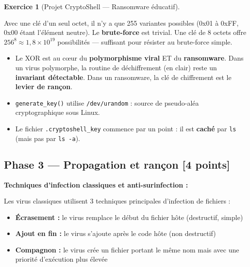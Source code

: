 \documentclass[a4paper,11pt]{article}
\theoremstyle{plain}
\theoremstyle{definition}
\newtheorem{exercice}{Exercice}
\begin{document}
\begin{exercice}[Projet CryptoShell --- Ransomware éducatif]
\begin{correction}
\begin{attention}
Avec une clé d'un seul octet, il n'y a que 255 variantes possibles (0x01 à 0xFF, 0x00 étant l'élément neutre). Le \textbf{brute-force} est trivial. Une clé de 8 octets offre $256^8 \approx 1{,}8 \times 10^{19}$ possibilités --- suffisant pour résister au brute-force simple.
\end{attention}

\begin{pointcle}
\begin{itemize}
    \item Le XOR est au c\oe ur du \textbf{polymorphisme viral} ET du \textbf{ransomware}. Dans un virus polymorphe, la routine de déchiffrement (en clair) reste un \textbf{invariant détectable}. Dans un ransomware, la clé de chiffrement est le \textbf{levier de rançon}.
    \item \texttt{generate\_key()} utilise \texttt{/dev/urandom} : source de pseudo-aléa cryptographique sous Linux.
    \item Le fichier \texttt{.cryptoshell\_key} commence par un point : il est \textbf{caché} par \texttt{ls} (mais pas par \texttt{ls -a}).
\end{itemize}
\end{pointcle}

\end{correction}



\subsection*{Phase 3 --- Propagation et rançon \hfill \normalsize [4 points]}

\begin{rappel}
\textbf{Techniques d'infection classiques et anti-surinfection :}

Les virus classiques utilisent 3 techniques principales d'infection de fichiers :
\begin{itemize}
    \item \textbf{Écrasement :} le virus remplace le début du fichier hôte (destructif, simple)
    \item \textbf{Ajout en fin :} le virus s'ajoute après le code hôte (non destructif)
    \item \textbf{Compagnon :} le virus crée un fichier portant le même nom mais avec une priorité d'exécution plus élevée
\end{itemize}


\end{rappel}
\end{exercice}
\end{document}
